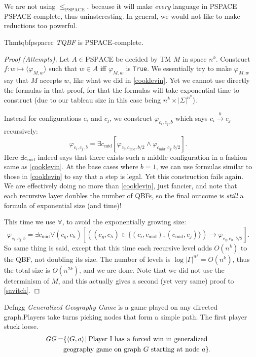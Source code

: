 We are not using $\leq_{\mathrm{PSPACE}}$, because it will make \textit{every} language in PSPACE PSPACE-complete, thus uninsteresting. In general, we would not like to make reductions too powerful.

\begin{reference}{Thm}{tqbfpspacec}
  \textit{TQBF} is {PSPACE-complete}.
\end{reference}

\begin{proof}[Proof (Attempts)]
  Let $A\in \mathrm{PSPACE}$ be decided by TM $M$ in space $n^k$. Construct $f:w\mapsto \langle \varphi_{M,w}\rangle$ such that $w\in A$ iff $\varphi_{M,w}$ is \texttt{True}. We essentially try to make $\varphi_{M,w}$ say that $M$ accepts $w$, like what we did in \ref{cooklevin}. Yet we cannot use directly the formulas in that proof, for that the formulas will take exponential time to construct (due to our tableau size in this case being $n^k\times |\Sigma|^{n^k}$).

  Instead for configurations $c_i$ and $c_j$, we construct $\varphi_{c_i,c_j,b}$ which says $c_i\xrightarrow{b}c_j$ recursively:
  \[
    \varphi_{c_i,c_j,b}=\exists c_{\text{mid}}\left[\varphi_{c_i,c_{\text{mid}},b/2}\wedge \varphi_{c_{\text{mid}},c_j,b/2}\right].
  \]
  Here $\exists c_{\text{mid}}$ indeed says that there exists such a middle configuration in a fashion same as \ref{cooklevin}. At the base cases where $b=1$, we can use formulas similar to those in \ref{cooklevin} to say that a step is legal. Yet this construction fails again. We are effectively doing no more than \ref{cooklevin}, just fancier, and note that each recursive layer doubles the number of QBFs, so the final outcome is \textit{still} a formula of exponential size (and time)!

  This time we use $\forall$, to avoid the exponentially growing size:
  \[
    \varphi_{c_i,c_j,b}=\exists c_{\text{mid}}\forall(c_g,c_h)\left[\left((c_g,c_h)\in\{(c_i,c_{\text{mid}}),(c_{\text{mid}},c_j)\}\right)\to\varphi_{c_g,c_h,b/2}\right].
  \]
  So same thing is said, except that this time each recursive level adds $O(n^k)$ to the QBF, not doubling its size. The number of levels is $\log |\Gamma|^{n^k}=O(n^k)$, thus the total size is $O(n^{2k})$, and we are done. Note that we did not use the determinism of $M$, and this actually gives a second (yet very same) proof to \ref{savitch}.
\end{proof}

\begin{reference}{Defn}{gg}
  \emph{Generalized Geography Game} is a game played on any directed graph.Players take turns picking nodes that form a simple path. The first player stuck loese.
  \begin{align*}
    \textit{GG}= & \{\langle G,a\rangle|\text{ Player I has a forced win in generalized} \\
                 & \text{geography game on graph }G\text{ starting at node }a\}.\qedhere
  \end{align*}
\end{reference}

